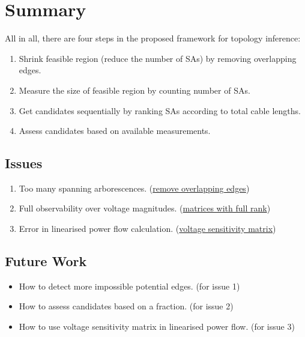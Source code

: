 \documentclass[
]{book}
\providecommand{\tightlist}{%
  \setlength{\itemsep}{0pt}\setlength{\parskip}{0pt}}
\begin{document}
\hypertarget{summary}{%
\section{Summary}\label{summary}}

All in all, there are four steps in the proposed framework for topology inference:

\begin{enumerate}
\def\labelenumi{\arabic{enumi}.}
\tightlist
\item
  Shrink feasible region (reduce the number of SAs) by removing overlapping
  edges.
\item
  Measure the size of feasible region by counting number of SAs.
\item
  Get candidates sequentially by ranking SAs according to total cable lengths.
\item
  Assess candidates based on available measurements.
\end{enumerate}

\hypertarget{issues}{%
\subsection*{Issues}\label{issues}}

\begin{enumerate}
\def\labelenumi{\arabic{enumi}.}
\tightlist
\item
  Too many spanning arborescences. (\protect\hyperlink{overlapping}{remove overlapping edges})
\item
  Full observability over voltage magnitudes. (\protect\hyperlink{BRM}{matrices with full
  rank})
\item
  Error in linearised power flow calculation. (\protect\hyperlink{VSM}{voltage sensitivity
  matrix})
\end{enumerate}

\hypertarget{future-work}{%
\subsection*{Future Work}\label{future-work}}

\begin{itemize}
\tightlist
\item
  How to detect more impossible potential edges. (for issue 1)
\item
  How to assess candidates based on a fraction. (for issue 2)
\item
  How to use voltage sensitivity matrix in linearised power flow. (for issue 3)
\end{itemize}

  
\end{document}
